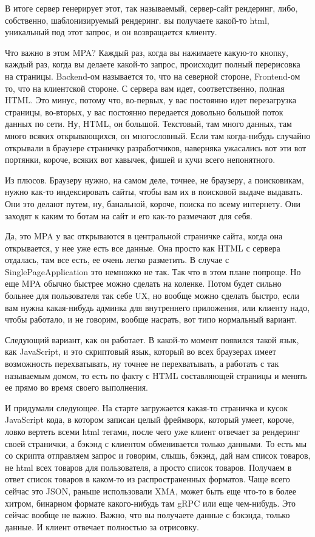 \documentclass[12pt]{article} %
\begin{document}
В итоге сервер генерирует этот, так называемый, сервер-сайт рендеринг, либо, собственно, шаблонизируемый рендеринг.  вы получаете какой-то html, уникальный под этот запрос, и он возвращается клиенту.  

Что важно в этом MPA?  Каждый раз, когда вы нажимаете какую-то кнопку, каждый раз, когда вы делаете какой-то запрос, происходит полный перерисовка на страницы. Backend-ом называется то, что на северной стороне, Frontend-ом то, что на клиентской стороне.  С сервера вам идет, соответственно, полная HTML.  
Это минус, потому что, во-первых, у вас постоянно идет перезагрузка страницы, во-вторых, у вас постоянно передается довольно большой поток данных по сети.  Ну, HTML, он большой.  Текстовый, там много данных, там много всяких открывающихся, он многословный.  Если там когда-нибудь случайно открывали в браузере страничку разработчиков, наверняка ужасались вот эти вот портянки, короче, всяких вот кавычек, фишей и кучи всего непонятного.  

Из плюсов.  Браузеру нужно, на самом деле, точнее, не браузеру, а поисковикам, нужно как-то индексировать сайты, чтобы вам их в поисковой выдаче выдавать.  Они это делают путем, ну, банальной, короче, поиска по всему интернету.  Они заходят к каким то ботам на сайт и его как-то размечают для себя.


Да, это MPA у вас открываются в центральной страничке сайта, когда она открывается, у нее уже есть все данные.  Она просто как HTML с сервера отдалась, там все есть, ее очень легко разметить.  В случае с SinglePageApplication это немножко не так.  Так что в этом плане попроще.  Но еще MPA обычно быстрее можно сделать на коленке.  Потом будет сильно больнее для пользователя так себе UX, но вообще можно сделать быстро, если вам нужна какая-нибудь админка для внутреннего приложения, или клиенту надо, чтобы работало, и не говорим, вообще насрать, вот типо нормальный вариант. 

Следующий вариант, как он работает. В какой-то момент появился такой язык, как JavaScript, и это скриптовый язык, который во всех браузерах имеет возможность перехватывать, ну точнее не перехватывать, а работать с так называемым домом, то есть по факту с HTML составляющей страницы и менять ее прямо во время своего выполнения.  

И придумали следующее. На старте загружается какая-то страничка и кусок JavaScript кода, в котором записан целый фреймворк, который умеет, короче, ловко вертеть всеми html тегами, после чего уже клиент отвечает за рендеринг своей странички, а бэкэнд с клиентом обменивается только данными. То есть мы со скрипта отправляем запрос и говорим, слышь, бэкэнд, дай нам список товаров, не html всех товаров для пользователя, а просто список товаров. Получаем в ответ список товаров в каком-то из распространенных форматов. Чаще всего сейчас это JSON, раньше использовали XMA, может быть еще что-то в более хитром, бинарном формате какого-нибудь там gRPC или еще чем-нибудь.  Это сейчас вообще не важно. Важно, что вы получаете данные с бэкэнда, только данные. И клиент отвечает полностью за отрисовку.  
\end{document}
